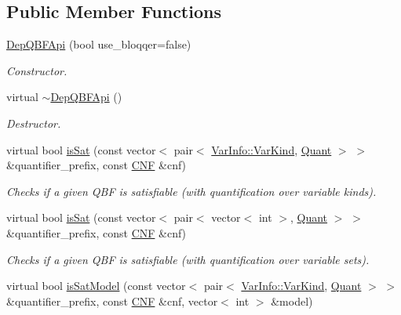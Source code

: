 \subsection*{Public Member Functions}
\begin{DoxyCompactItemize}
\item 
\hyperlink{classDepQBFApi_a07fe68fc15e26247526ed06377c0a207}{Dep\-Q\-B\-F\-Api} (bool use\-\_\-bloqqer=false)
\begin{DoxyCompactList}\small\item\em Constructor. \end{DoxyCompactList}\item 
virtual \hyperlink{classDepQBFApi_ab9ce72ab0d48d1e1b6c6ffaf31ec46d6}{$\sim$\-Dep\-Q\-B\-F\-Api} ()
\begin{DoxyCompactList}\small\item\em Destructor. \end{DoxyCompactList}\item 
virtual bool \hyperlink{classDepQBFApi_a1f755841365d67f4c704bf919cb4f8b5}{is\-Sat} (const vector$<$ pair$<$ \hyperlink{classVarInfo_a64d1da76cf84fe674e5fef9764ef11cf}{Var\-Info\-::\-Var\-Kind}, \hyperlink{classQBFSolver_ac091e263cb55286cc07b2451bcf4d3c7}{Quant} $>$ $>$ \&quantifier\-\_\-prefix, const \hyperlink{classCNF}{C\-N\-F} \&cnf)
\begin{DoxyCompactList}\small\item\em Checks if a given Q\-B\-F is satisfiable (with quantification over variable kinds). \end{DoxyCompactList}\item 
virtual bool \hyperlink{classDepQBFApi_a8b220fef622b400b37d8298f29826938}{is\-Sat} (const vector$<$ pair$<$ vector$<$ int $>$, \hyperlink{classQBFSolver_ac091e263cb55286cc07b2451bcf4d3c7}{Quant} $>$ $>$ \&quantifier\-\_\-prefix, const \hyperlink{classCNF}{C\-N\-F} \&cnf)
\begin{DoxyCompactList}\small\item\em Checks if a given Q\-B\-F is satisfiable (with quantification over variable sets). \end{DoxyCompactList}\item 
virtual bool \hyperlink{classDepQBFApi_af70faa0b2136fe04e2a22743f2ca7c8e}{is\-Sat\-Model} (const vector$<$ pair$<$ \hyperlink{classVarInfo_a64d1da76cf84fe674e5fef9764ef11cf}{Var\-Info\-::\-Var\-Kind}, \hyperlink{classQBFSolver_ac091e263cb55286cc07b2451bcf4d3c7}{Quant} $>$ $>$ \&quantifier\-\_\-prefix, const \hyperlink{classCNF}{C\-N\-F} \&cnf, vector$<$ int $>$ \&model)

\end{DoxyCompactItemize}
